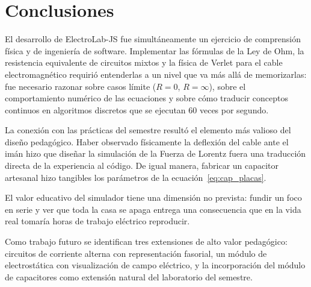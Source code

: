 \documentclass[12pt, a4paper]{article}
\begin{document}
\section{Conclusiones}

El desarrollo de ElectroLab-JS fue simultáneamente un ejercicio de
comprensión física y de ingeniería de software. Implementar las fórmulas
de la Ley de Ohm, la resistencia equivalente de circuitos mixtos y la
física de Verlet para el cable electromagnético requirió entenderlas a un
nivel que va más allá de memorizarlas: fue necesario razonar sobre casos
límite ($R = 0$, $R = \infty$), sobre el comportamiento numérico de las
ecuaciones y sobre cómo traducir conceptos continuos en algoritmos
discretos que se ejecutan 60 veces por segundo.

La conexión con las prácticas del semestre resultó el elemento más valioso
del diseño pedagógico. Haber observado físicamente la deflexión del cable
ante el imán hizo que diseñar la simulación de la Fuerza de Lorentz fuera
una traducción directa de la experiencia al código. De igual manera,
fabricar un capacitor artesanal hizo tangibles los parámetros de la
ecuación~\eqref{eq:cap_placas}.

El valor educativo del simulador tiene una dimensión no prevista: fundir
un foco en serie y ver que toda la casa se apaga entrega una consecuencia
que en la vida real tomaría horas de trabajo eléctrico reproducir.

Como trabajo futuro se identifican tres extensiones de alto valor
pedagógico: circuitos de corriente alterna con representación fasorial,
un módulo de electrostática con visualización de campo eléctrico, y la
incorporación del módulo de capacitores como extensión natural del
laboratorio del semestre.
\end{document}
